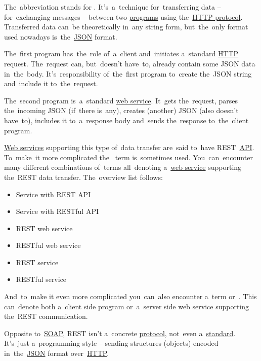 \label{rest}
The~abbreviation stands for .
It's~a~technique for~transferring data -- for~exchanging messages -- between two \hyperref[applicationprocessprogramservicethread]{programs} using the~\hyperref[http]{HTTP protocol}.
Transferred data can~be theoretically in~any string form, but~the~only format used nowadays is~the~\hyperref[json]{JSON} format.

The~first program has~the~role of~a~client and~initiates a~standard \hyperref[http]{HTTP} request.
The~request can, but~doesn't have~to, already contain some JSON data in~the~body.
It's~responsibility of~the~first program to~create the~JSON string and~include it to~the~request.

The~second program is~a~standard \hyperref[webserviceapplication]{web service}.
It~gets the~request, parses the~incoming JSON (if~there is~any), creates (another) JSON (also doesn't have~to), includes it to~a~response body and~sends the~response to~the~client program.

\hyperref[webserviceapplication]{Web services} supporting this type of~data transfer are~said to~have \mbox{REST \hyperref[api]{API}}.
To~make~it more complicated the~ term is~sometimes used.
You~can~encounter many different combinations of~terms all~denoting a~\hyperref[webserviceapplication]{web service} supporting the~REST data transfer.
The~overview list follows:
\begin{itemize}
    \item Service with REST API
    \item Service with RESTful API
    \item REST web service
    \item RESTful web service
    \item REST service
    \item RESTful service
\end{itemize}

\noindent And~to~make it even more complicated you~can~also encounter a~term  or~.
This can~denote both a~client side program or~a~server side web service supporting the~REST communication.

\warning Opposite to~\hyperref[soap]{SOAP}, REST isn't a~concrete \hyperref[protocolstandard]{protocol}, not~even a~\hyperref[protocolstandard]{standard}.
It's~just a~programming style -- sending structures (objects) encoded in~the~\hyperref[json]{JSON} format over~\hyperref[http]{HTTP}.
